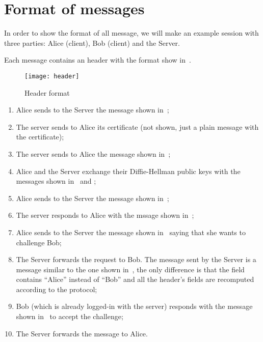 \section{Format of messages}\label{sec:format}

In order to show the format of all message, we will make an example session with
three parties: Alice (client), Bob (client) and the Server.

Each message contains an header with the format show in~.

\begin{figure}[htb]
	\texttt{[image: header]}
	\caption{Header format}\label{fig:header}
\end{figure}

\begin{enumerate}
	\item Alice sends to the Server the  message shown
		in~;
	\item The server sends to Alice its certificate (not shown, just a plain
		message with the certificate);
	\item The server sends to Alice the  message shown
		in~;
	\item Alice and the Server exchange their Diffie-Hellman public keys
		with the messages shown in~ and
		;
	\item Alice sends to the Server the  message
		shown in~;
	\item The server responds to Alice with the  mssage
		shown in~;
	\item Alice sends to the Server the  message shown
		in~ saying that she wants to challenge
		Bob;
	\item The Server forwards the request to Bob. The message sent by the
		Server is a  message similar to the one
		shown in~, the only difference is that
		the  field contains ``Alice'' instead of ``Bob''
		and all the header's fields are recomputed according to the
		protocol;
	\item Bob (which is already logged-in with the server) responds with the
		 message shown
		in~ to accept the challenge;
	\item The Server forwards the  message to Alice.

\end{enumerate}
